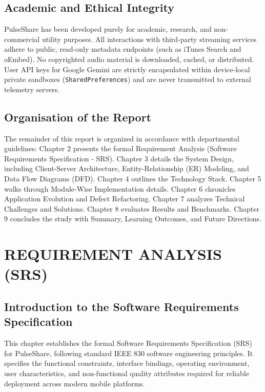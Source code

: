 \documentclass[12pt,a4paper]{report}
\begin{document}
\section{Academic and Ethical Integrity}
PulseShare has been developed purely for academic, research, and non-commercial utility purposes. All interactions with third-party streaming services adhere to public, read-only metadata endpoints (such as iTunes Search and oEmbed). No copyrighted audio material is downloaded, cached, or distributed. User API keys for Google Gemini are strictly encapsulated within device-local private sandboxes (\texttt{SharedPreferences}) and are never transmitted to external telemetry servers.

\section{Organisation of the Report}
The remainder of this report is organized in accordance with departmental guidelines: Chapter 2 presents the formal Requirement Analysis (Software Requirements Specification - SRS). Chapter 3 details the System Design, including Client-Server Architecture, Entity-Relationship (ER) Modeling, and Data Flow Diagrams (DFD). Chapter 4 outlines the Technology Stack. Chapter 5 walks through Module-Wise Implementation details. Chapter 6 chronicles Application Evolution and Defect Refactoring. Chapter 7 analyzes Technical Challenges and Solutions. Chapter 8 evaluates Results and Benchmarks. Chapter 9 concludes the study with Summary, Learning Outcomes, and Future Directions.

\chapter{REQUIREMENT ANALYSIS (SRS)}

\section{Introduction to the Software Requirements Specification}
This chapter establishes the formal Software Requirements Specification (SRS) for PulseShare, following standard IEEE 830 software engineering principles. It specifies the functional constraints, interface bindings, operating environment, user characteristics, and non-functional quality attributes required for reliable deployment across modern mobile platforms.
\end{document}
